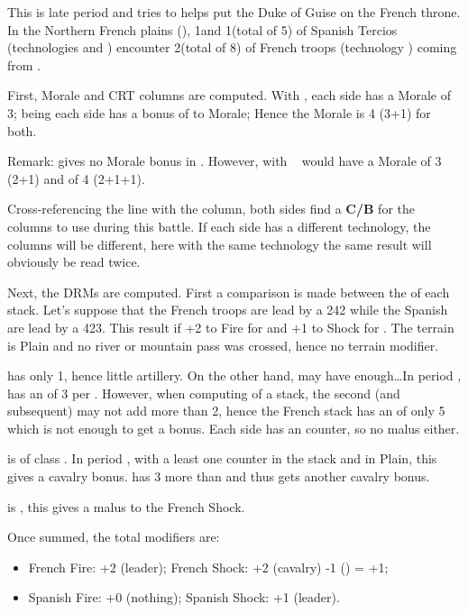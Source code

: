 \begin{exemple}
  This is late period  and \HIS tries to helps 
  put the Duke of Guise on the French throne. In the Northern French plains
  (\provinceArtois), 1\ARMY\faceplus and 1\LD (total of 5\LD) of
   Spanish Tercios (technologies \TMUS and \TTER) encounter
  2\ARMY\faceplus (total of 8\LD) of  French troops (technology
  \TMUS) coming from .

  First, Morale and CRT columns are computed. With \TMUS, each side has a
  Morale of 3; being  each side has a bonus of  to
  Morale; Hence the Morale is 4 (3+1) for both.

  Remark: \TTER gives no Morale bonus in \TMUS. However, with \TARQ\ \FRA
  would have a Morale of 3 (2+1) and \HIS of 4 (2+1+1).

  Cross-referencing the \TMUS line with the \TMUS column, both sides find a
  \textbf{C/B} for the columns to use during this battle. If each side has a
  different technology, the columns will be different, here with the same
  technology the same result will obviously be read twice.

  Next, the DRMs are computed. First a comparison is made between the \LeaderG
  of each stack. Let's suppose that the French troops are lead by a 242
  \LeaderG while the Spanish are lead by a 423. This result if +2 to Fire for
  \FRA and +1 to Shock for \HIS. The terrain is Plain and no river or
  mountain pass was crossed, hence no terrain modifier.

  \HIS has only 1\ARMY\Faceplus, hence little artillery. On the other hand,
  \FRA may have enough\ldots In period , \FRA has an
   of 3 per \ARMY\Faceplus. However, when computing
   of a stack, the second (and subsequent) \ARMY may
  not add more than 2, hence the French stack has an 
  of only 5 which is not enough to get a bonus. Each side has an \ARMY
  counter, so no malus either.

  \FRA is of class \CAIV. In period , with a least one \ARMY
  counter in the stack and in Plain, this gives a  cavalry
  bonus. \FRA has 3 more \LD than \HIS and thus gets another 
  cavalry bonus.

  \HIS is \TTER, this gives a  malus to the French Shock.

  Once summed, the total modifiers are:
  \begin{itemize}
  \item French Fire: +2 (leader); \quad French Shock: +2 (cavalry) -1 (\TTER)
    = +1;
  \item Spanish Fire: +0 (nothing); \quad Spanish Shock: +1 (leader).
  \end{itemize}


\end{exemple}
